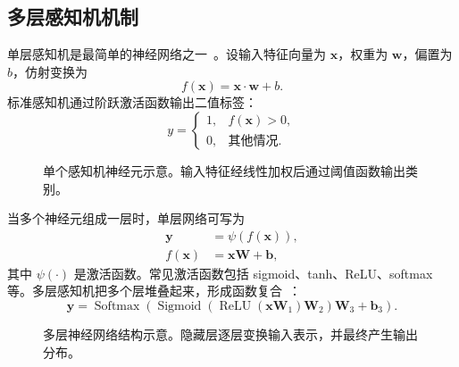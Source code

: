 \subsection{多层感知机机制}

单层感知机是最简单的神经网络之一~\cite{Rosenblatt1958Perceptron}。设输入特征向量为 $\mathbf{x}$，权重为 $\mathbf{w}$，偏置为 $b$，仿射变换为
\begin{equation}
  f(\mathbf{x})=\mathbf{x}\cdot \mathbf{w}+b.
\end{equation}
标准感知机通过阶跃激活函数输出二值标签：
\begin{equation}
  y=
  \begin{cases}
    1, & f(\mathbf{x})>0,\\
    0, & \text{其他情况}.
  \end{cases}
\end{equation}


\begin{figure}[htbp]
  \centering
  
  \caption{单个感知机神经元示意。输入特征经线性加权后通过阈值函数输出类别。}
  \label{fig:nlpbook-perceptron-single-neuron}
\end{figure}

当多个神经元组成一层时，单层网络可写为
\begin{align}
  \mathbf{y} &= \psi(f(\mathbf{x})),\\
  f(\mathbf{x}) &= \mathbf{x}\mathbf{W}+\mathbf{b},
\end{align}
其中 $\psi(\cdot)$ 是激活函数。常见激活函数包括 sigmoid、tanh、ReLU、softmax 等。多层感知机把多个层堆叠起来，形成函数复合~\cite{RumelhartEtAl1986Backprop,GoodfellowEtAl2016DeepLearning}：
\begin{equation}
  \mathbf{y}
  =
  \operatorname{Softmax}
  \left(
    \operatorname{Sigmoid}
    \left(
      \operatorname{ReLU}(\mathbf{x}\mathbf{W}_1)\mathbf{W}_2
    \right)
    \mathbf{W}_3+\mathbf{b}_3
  \right).
\end{equation}


\begin{figure}[htbp]
  \centering
  
  \caption{多层神经网络结构示意。隐藏层逐层变换输入表示，并最终产生输出分布。}
  \label{fig:nlpbook-multi-layer-network}
\end{figure}

